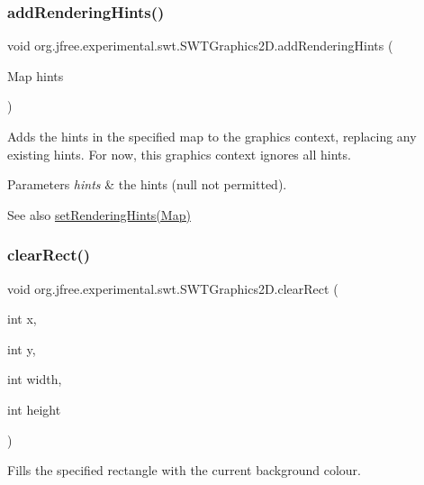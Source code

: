 \subsubsection{\texorpdfstring{add\+Rendering\+Hints()}{addRenderingHints()}}
{\footnotesize\ttfamily void org.\+jfree.\+experimental.\+swt.\+S\+W\+T\+Graphics2\+D.\+add\+Rendering\+Hints (\begin{DoxyParamCaption}\item[{Map}]{hints }\end{DoxyParamCaption})}

Adds the hints in the specified map to the graphics context, replacing any existing hints. For now, this graphics context ignores all hints.


\begin{DoxyParams}{Parameters}
{\em hints} & the hints ({\ttfamily null} not permitted).\\
\hline
\end{DoxyParams}
\begin{DoxySeeAlso}{See also}
\mbox{\hyperlink{classorg_1_1jfree_1_1experimental_1_1swt_1_1_s_w_t_graphics2_d_adcf05fe2a29c5bf8aa05ae31c6fb5a7e}{set\+Rendering\+Hints(\+Map)}} 
\end{DoxySeeAlso}
\mbox{\label{classorg_1_1jfree_1_1experimental_1_1swt_1_1_s_w_t_graphics2_d_a68cee69da3b3e75bb89dbd08f6ec2abf}} 
\subsubsection{\texorpdfstring{clear\+Rect()}{clearRect()}}
{\footnotesize\ttfamily void org.\+jfree.\+experimental.\+swt.\+S\+W\+T\+Graphics2\+D.\+clear\+Rect (\begin{DoxyParamCaption}\item[{int}]{x,  }\item[{int}]{y,  }\item[{int}]{width,  }\item[{int}]{height }\end{DoxyParamCaption})}

Fills the specified rectangle with the current background colour.


